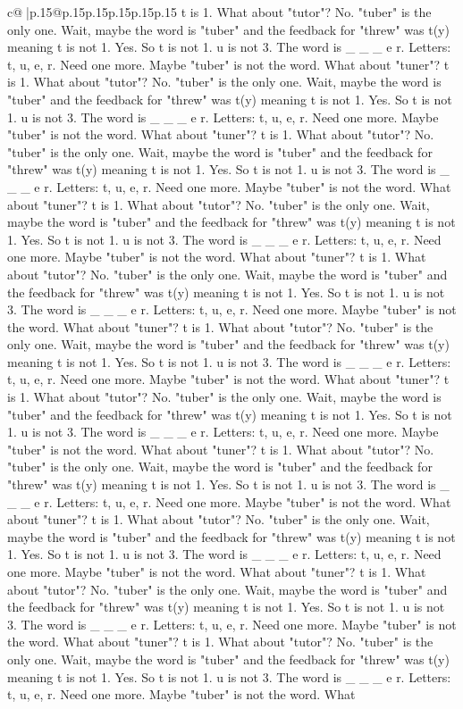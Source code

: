 \documentclass{article}
\begin{document}
{\begin{supertabular}{c@{$\;$}|p{.15\linewidth}@{}p{.15\linewidth}p{.15\linewidth}p{.15\linewidth}p{.15\linewidth}p{.15\linewidth}}
{{{t is 1. What about "tutor"? No. "tuber" is the only one. Wait, maybe the word is "tuber" and the feedback for "threw" was t(y) meaning t is not 1. Yes. So t is not 1. u is not 3. The word is \_ \_ \_ e r. Letters: t, u, e, r. Need one more. Maybe "tuber" is not the word. What about "tuner"? t is 1. What about "tutor"? No. "tuber" is the only one. Wait, maybe the word is "tuber" and the feedback for "threw" was t(y) meaning t is not 1. Yes. So t is not 1. u is not 3. The word is \_ \_ \_ e r. Letters: t, u, e, r. Need one more. Maybe "tuber" is not the word. What about "tuner"? t is 1. What about "tutor"? No. "tuber" is the only one. Wait, maybe the word is "tuber" and the feedback for "threw" was t(y) meaning t is not 1. Yes. So t is not 1. u is not 3. The word is \_ \_ \_ e r. Letters: t, u, e, r. Need one more. Maybe "tuber" is not the word. What about "tuner"? t is 1. What about "tutor"? No. "tuber" is the only one. Wait, maybe the word is "tuber" and the feedback for "threw" was t(y) meaning t is not 1. Yes. So t is not 1. u is not 3. The word is \_ \_ \_ e r. Letters: t, u, e, r. Need one more. Maybe "tuber" is not the word. What about "tuner"? t is 1. What about "tutor"? No. "tuber" is the only one. Wait, maybe the word is "tuber" and the feedback for "threw" was t(y) meaning t is not 1. Yes. So t is not 1. u is not 3. The word is \_ \_ \_ e r. Letters: t, u, e, r. Need one more. Maybe "tuber" is not the word. What about "tuner"? t is 1. What about "tutor"? No. "tuber" is the only one. Wait, maybe the word is "tuber" and the feedback for "threw" was t(y) meaning t is not 1. Yes. So t is not 1. u is not 3. The word is \_ \_ \_ e r. Letters: t, u, e, r. Need one more. Maybe "tuber" is not the word. What about "tuner"? t is 1. What about "tutor"? No. "tuber" is the only one. Wait, maybe the word is "tuber" and the feedback for "threw" was t(y) meaning t is not 1. Yes. So t is not 1. u is not 3. The word is \_ \_ \_ e r. Letters: t, u, e, r. Need one more. Maybe "tuber" is not the word. What about "tuner"? t is 1. What about "tutor"? No. "tuber" is the only one. Wait, maybe the word is "tuber" and the feedback for "threw" was t(y) meaning t is not 1. Yes. So t is not 1. u is not 3. The word is \_ \_ \_ e r. Letters: t, u, e, r. Need one more. Maybe "tuber" is not the word. What about "tuner"? t is 1. What about "tutor"? No. "tuber" is the only one. Wait, maybe the word is "tuber" and the feedback for "threw" was t(y) meaning t is not 1. Yes. So t is not 1. u is not 3. The word is \_ \_ \_ e r. Letters: t, u, e, r. Need one more. Maybe "tuber" is not the word. What about "tuner"? t is 1. What about "tutor"? No. "tuber" is the only one. Wait, maybe the word is "tuber" and the feedback for "threw" was t(y) meaning t is not 1. Yes. So t is not 1. u is not 3. The word is \_ \_ \_ e r. Letters: t, u, e, r. Need one more. Maybe "tuber" is not the word. What about "tuner"? t is 1. What about "tutor"? No. "tuber" is the only one. Wait, maybe the word is "tuber" and the feedback for "threw" was t(y) meaning t is not 1. Yes. So t is not 1. u is not 3. The word is \_ \_ \_ e r. Letters: t, u, e, r. Need one more. Maybe "tuber" is not the word. What }}}
\end{supertabular}}
\end{document}
